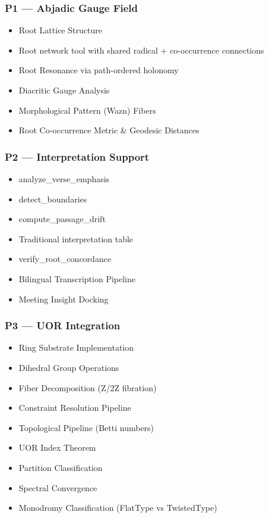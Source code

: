 \documentclass[12pt,a4paper]{article}
\providecommand{\tightlist}{\setlength{\itemsep}{0pt}\setlength{\parskip}{0pt}}
\begin{document}
\subsubsection{P1 --- Abjadic Gauge Field}\label{p1-abjadic-gauge-field}

\begin{itemize}
\tightlist
\item
  Root Lattice Structure
\item
  Root network tool with shared radical + co-occurrence connections
\item
  Root Resonance via path-ordered holonomy
\item
  Diacritic Gauge Analysis
\item
  Morphological Pattern (Wazn) Fibers
\item
  Root Co-occurrence Metric \& Geodesic Distances
\end{itemize}

\subsubsection{P2 --- Interpretation
Support}\label{p2-interpretation-support}

\begin{itemize}
\tightlist
\item
  analyze\_verse\_emphasis
\item
  detect\_boundaries
\item
  compute\_passage\_drift
\item
  Traditional interpretation table
\item
  verify\_root\_concordance
\item
  Bilingual Transcription Pipeline
\item
  Meeting Insight Docking
\end{itemize}

\subsubsection{P3 --- UOR Integration}\label{p3-uor-integration}

\begin{itemize}
\tightlist
\item
  Ring Substrate Implementation
\item
  Dihedral Group Operations
\item
  Fiber Decomposition (Z/2Z fibration)
\item
  Constraint Resolution Pipeline
\item
  Topological Pipeline (Betti numbers)
\item
  UOR Index Theorem
\item
  Partition Classification
\item
  Spectral Convergence
\item
  Monodromy Classification (FlatType vs TwistedType)
\end{itemize}
\end{document}
